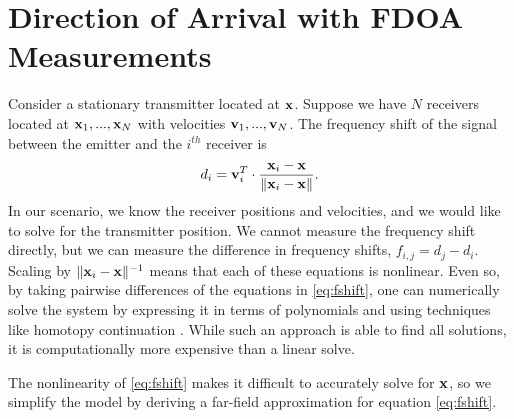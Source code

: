 \section{Direction of Arrival with FDOA Measurements}
\label{s:FDOA}

Consider a stationary transmitter located at $\mathbf{x}$. Suppose we have $N$ receivers located at $\mathbf{x}_1, ...,\mathbf{x}_N$ with velocities $\mathbf{v}_1, ...,\mathbf{v}_N$. The frequency shift of the signal between the emitter and the $i^{th}$ receiver is
\begin{align}
  \label{eq:fshift}
  d_i =  \mathbf{v}_i^T\cdot\frac{\mathbf{x}_i-\mathbf{x}}{\|\mathbf{x}_i-\mathbf{x}\|}.
\end{align}
In our scenario, we know the receiver positions and velocities, and we would like to solve for the transmitter position. We cannot measure the frequency shift directly, but we can measure the difference in frequency shifts,
$f_{i,j} = d_j-d_i$. Scaling by $\|\mathbf{x}_i-\mathbf{x}\|^{-1}$ means that each of these equations is nonlinear. Even so, by taking pairwise differences of the equations in \eqref{eq:fshift}, one can numerically solve the system by expressing it in terms of polynomials and using techniques like homotopy continuation \cite{Cameron}. While such an approach is able to find all solutions, it is computationally more expensive than a linear solve.

The nonlinearity of \ref{eq:fshift} makes it difficult to accurately solve for $\mathbf{x}$, so we simplify the model by deriving a far-field approximation for equation \ref{eq:fshift}.

